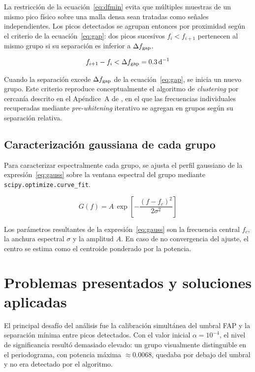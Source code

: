 \documentclass[letterpaper,12pt]{extarticle}
\begin{document}
La restricción de la ecuación~\ref{eq:dfmin} evita que múltiples muestras de un mismo pico físico sobre una malla densa sean tratadas como señales independientes. Los picos detectados se agrupan entonces por proximidad según el criterio de la ecuación~\ref{eq:gap}: dos picos sucesivos $f_i < f_{i+1}$ pertenecen al mismo grupo si su separación es inferior a $\Delta f_{\rm gap}$.

\begin{equation}
    f_{i+1} - f_i < \Delta f_{\rm gap} = 0.3\,\mathrm{d}^{-1}
    \label{eq:gap}
\end{equation}

Cuando la separación excede $\Delta f_{\rm gap}$ de la ecuación~\ref{eq:gap}, se inicia un nuevo grupo. Este criterio reproduce conceptualmente el algoritmo de \textit{clustering} por cercanía descrito en el Apéndice~A de \cite{labadiebartz2022}, en el que las frecuencias individuales recuperadas mediante \textit{pre-whitening} iterativo se agregan en grupos según su separación relativa.

\subsection{Caracterización gaussiana de cada grupo}

Para caracterizar espectralmente cada grupo, se ajusta el perfil gaussiano de la expresión~\ref{eq:gauss} sobre la ventana espectral del grupo mediante \texttt{scipy.optimize.curve\_fit}.

\begin{equation}
    G(f) = A\,\exp\!\left[-\frac{(f - f_c)^2}{2\sigma^2}\right]
    \label{eq:gauss}
\end{equation}

Los parámetros resultantes de la expresión~\ref{eq:gauss} son la frecuencia central $f_c$, la anchura espectral $\sigma$ y la amplitud $A$. En caso de no convergencia del ajuste, el centro se estima como el centroide ponderado por la potencia.


\section{Problemas presentados y soluciones aplicadas}
\label{sec:problemas}

El principal desafío del análisis fue la calibración simultánea del umbral FAP y la separación mínima entre picos detectados. Con el valor inicial $\alpha = 10^{-4}$, el nivel de significancia resultó demasiado elevado: un grupo visualmente distinguible en el periodograma, con potencia máxima $\approx 0.0068$, quedaba por debajo del umbral y no era detectado por el algoritmo.
\end{document}
